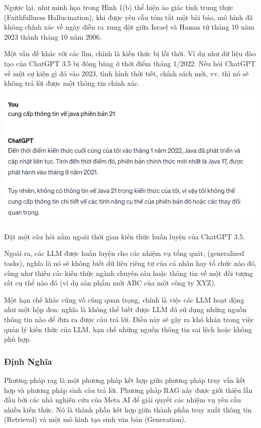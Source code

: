 \documentclass[a4paper, 12pt, openany]{book}
\begin{document}
Ngược lại, như minh họa trong Hình 1(b) thể hiện ảo giác tính trung thực (Faithfullness Hallucination), khi được yêu cầu tóm tắt một bài báo, mô hình đã không chính xác về ngày diễn ra xung đột giữa Israel và Hamas từ tháng 10 năm 2023 thành tháng 10 năm 2006. 

Một vấn đề khác với các \ac{llm}, chính là kiến thức bị lỗi thời. Ví dụ như dữ liệu đào tạo của ChatGPT 3.5 bị đóng băng ở thời điểm tháng 1/2022. 
Nếu hỏi ChatGPT về một sự kiện gì đó vào 2023, tình hình thời tiết, chính sách mới, vv. thì nó sẽ không trả lời được một thông tin chính xác.

\begin{minipage}{\linewidth}
    \centering
    \includegraphics[width=14cm]{./assets/images/llm-limitation-1.png}
    \captionsetup{type=figure}
    \caption{Đặt một câu hỏi nằm ngoài thời gian kiến thức huấn luyện của ChatGPT 3.5.}
\end{minipage}

\vspace{0.2cm}

Ngoài ra, các LLM được huấn luyện cho các nhiệm vụ tổng quát, (generalized tasks), nghĩa là nó sẽ không biết dữ liệu riêng tư của cá nhân hay tổ chức nào đó, 
cũng như thiếu các kiến thức ngành chuyên sâu hoặc thông tin về một đối tượng rất cụ thể nào đó (ví dụ sản phẩm mới ABC của một công ty XYZ). 

Một hạn chế khác cũng vô cùng quan trọng, chính là việc các LLM hoạt động như một hộp đen: 
nghĩa là không thể biết được LLM đã sử dụng những nguồn thông tin nào để đưa ra được câu trả lời. Điều này sẽ gây ra
khó khăn trong việc quản lý kiến thức của LLM, hạn chế những nguồn thông tin sai lệch hoặc không phù hợp.


\subsubsection{Định Nghĩa}
Phương pháp \ac{rag} là một phương pháp kết hợp giữa phương pháp truy vấn kết hợp và phương pháp sinh câu trả lời.
Phương pháp RAG \cite{lewis2021retrievalaugmented} này được giới thiệu lần đầu bởi các nhà nghiên cứu của Meta AI để giải quyết các nhiệm vụ yêu cầu nhiều kiến thức.
Nó là thành phần kết hợp giữa thành phần truy xuất thông tin (Retrieval) và một mô hình tạo sinh văn bản (Generation).
\end{document}
